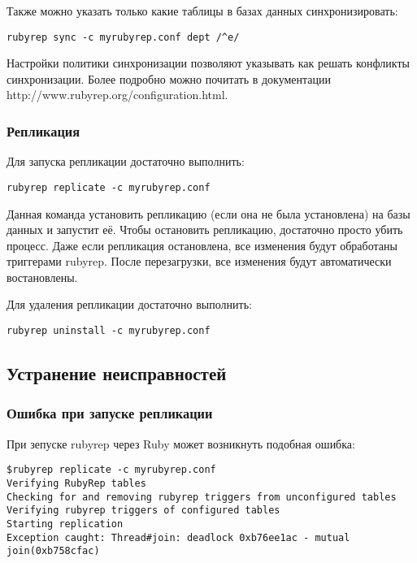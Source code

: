 Также можно указать только какие таблицы в базах данных синхронизировать:
\begin{verbatim}
rubyrep sync -c myrubyrep.conf dept /^e/
\end{verbatim}

Настройки политики синхронизации позволяют указывать как решать конфликты синхронизации. 
Более подробно можно почитать в документации http://www.rubyrep.org/configuration.html. 

\subsubsection{Репликация}
Для запуска репликации достаточно выполнить:
\begin{verbatim}
rubyrep replicate -c myrubyrep.conf
\end{verbatim}

Данная команда установить репликацию (если она не была установлена) на базы данных и запустит её.
Чтобы остановить репликацию, достаточно просто убить процесс. Даже если репликация остановлена, 
все изменения будут обработаны триггерами rubyrep. После перезагрузки, все изменения 
будут автоматически востановлены.

Для удаления репликации достаточно выполнить:
\begin{verbatim}
rubyrep uninstall -c myrubyrep.conf
\end{verbatim}

\subsection{Устранение неисправностей}
\subsubsection{Ошибка при запуске репликации}
При зепуске rubyrep через Ruby может возникнуть подобная ошибка:
\begin{verbatim}
$rubyrep replicate -c myrubyrep.conf 
Verifying RubyRep tables
Checking for and removing rubyrep triggers from unconfigured tables
Verifying rubyrep triggers of configured tables
Starting replication
Exception caught: Thread#join: deadlock 0xb76ee1ac - mutual join(0xb758cfac)
\end{verbatim}

